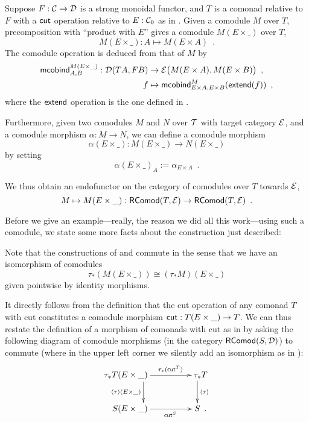 \documentclass{amsart}
\begin{document}
\begin{definition}\label{def:product_in_context}
 Suppose $F:{\mathcal{C}}\to\mathcal{D}$ is a strong monoidal functor, and $T$ is a comonad relative to $F$ with a $\mathsf{cut}$ operation 
 relative to $E:{\mathcal{C}}_0$ as in .
 Given a comodule $M$ over $T$,  precomposition with \enquote{product with $E$}
 gives a comodule $M(E\times\_)$ over $T$,
  \[    M(E\times \_) : A \mapsto M(E\times A) \enspace . \]
 The comodule operation is deduced from that of $M$ by 
 \begin{align*} \mathsf{mcobind}^{M(E\times\_)}_{A,B} : \mathcal{D}(TA,FB)&\to \mathcal{E}\bigl(M(E\times A), M(E\times B)\bigr) \enspace ,\\
                                                      f &\mapsto \mathsf{mcobind}^M_{E\times A,E\times B}(\mathsf{extend}(f)) \enspace ,
  \end{align*}                                        
where the $\mathsf{extend}$ operation is the one defined in .
 
 Furthermore, given two comodules $M$ and $N$ over $\mathcal{T}$ with target category $\mathcal{E}$, and a comodule morphism $\alpha : M \to N$,  
 we can define a comodule morphism \[\alpha(E\times \_) : M(E\times \_) \to N(E\times \_) \] by setting
          \[ \alpha(E \times \_)_A := \alpha_{E\times A} \enspace . \]
  
  \noindent
  We thus obtain an endofunctor on the category of comodules over $T$ towards $\mathcal{E}$,
   \[ M \mapsto  M (E\times \_) : \mathsf{RComod}(T,\mathcal{E}) \to \mathsf{RComod}(T,\mathcal{E}) \enspace . \]
\end{definition}


Before we give an example---really, the reason we did all this work---using such a comodule, we state some more facts about 
the construction just described:

\begin{remark}\label{rem:prod_pullback_commute}
 Note that the constructions of  and  commute in the sense that
 we have an isomorphism of comodules \[\tau_*(M(E\times \_)) \cong (\tau_*M)(E \times \_)  \]
 given pointwise by identity morphisms.
\end{remark}



It directly follows from the definition that the cut operation of any comonad $T$ with cut 
constitutes a comodule morphism $\mathsf{cut} : T(E\times \_) \to T$.
We can thus restate the definition of a morphism of comonads with cut as in  by asking the following diagram 
of comodule morphisms (in the category $\mathsf{RComod}(S,\mathcal{D})$) to commute
(where in the upper left corner we silently add an isomorphism as in ):
 \[ \begin{xy}
       \xymatrix{  **[l] \tau_*T(E\times \_ )  \ar[r]^{\tau_*(\cut^T)} \ar[d]_{\induced{\tau}(E\times \_)}  &  **[r] \tau_*T \ar[d]^{\induced{\tau}} \\
                   **[l]  S (E\times \_ ) \ar[r]_{\cut^S}  &  **[r] S  \enspace .
        }
      \end{xy}
   \]
\end{document}
